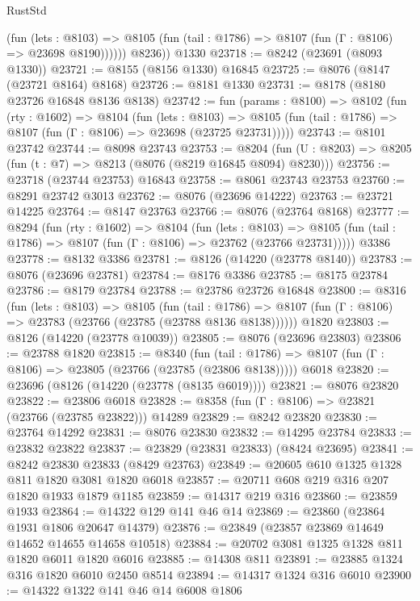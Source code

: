 \begin{lexlean}{RustStd}
\begin{coremodule}
              (fun (lets : @8103) =>
              @8105 (fun (tail : @1786) => @8107 (fun (Γ : @8106) => @23698 @8190))))))
        @8236))
    @1330
@23718 := @8242 (@23691 (@8093 @1330))
@23721 := @8155 (@8156 @1330) @16845
@23725 := @8076 (@8147 (@23721 @8164) @8168)
@23726 := @8181 @1330
@23731 := @8178 (@8180 @23726 @16848 @8136 @8138)
@23742 := fun (params : @8100) =>
  @8102
    (fun (rty : @1602) =>
    @8104
      (fun (lets : @8103) =>
      @8105 (fun (tail : @1786) => @8107 (fun (Γ : @8106) => @23698 (@23725 @23731)))))
@23743 := @8101 @23742
@23744 := @8098 @23743
@23753 := @8204
    (fun (U : @8203) => @8205 (fun (t : @7) => @8213 (@8076 (@8219 @16845 @8094) @8230)))
@23756 := @23718 (@23744 @23753) @16843
@23758 := @8061 @23743 @23753
@23760 := @8291 @23742 @3013
@23762 := @8076 (@23696 @14222)
@23763 := @23721 @14225
@23764 := @8147 @23763
@23766 := @8076 (@23764 @8168)
@23777 := @8294
    (fun (rty : @1602) =>
    @8104
      (fun (lets : @8103) =>
      @8105 (fun (tail : @1786) => @8107 (fun (Γ : @8106) => @23762 (@23766 @23731)))))
    @3386
@23778 := @8132 @3386
@23781 := @8126 (@14220 (@23778 @8140))
@23783 := @8076 (@23696 @23781)
@23784 := @8176 @3386
@23785 := @8175 @23784
@23786 := @8179 @23784
@23788 := @23786 @23726 @16848
@23800 := @8316
    (fun (lets : @8103) =>
    @8105
      (fun (tail : @1786) =>
      @8107 (fun (Γ : @8106) => @23783 (@23766 (@23785 (@23788 @8136 @8138))))))
    @1820
@23803 := @8126 (@14220 (@23778 @10039))
@23805 := @8076 (@23696 @23803)
@23806 := @23788 @1820
@23815 := @8340
    (fun (tail : @1786) => @8107 (fun (Γ : @8106) => @23805 (@23766 (@23785 (@23806 @8138)))))
    @6018
@23820 := @23696 (@8126 (@14220 (@23778 (@8135 @6019))))
@23821 := @8076 @23820
@23822 := @23806 @6018
@23828 := @8358 (fun (Γ : @8106) => @23821 (@23766 (@23785 @23822))) @14289
@23829 := @8242 @23820
@23830 := @23764 @14292
@23831 := @8076 @23830
@23832 := @14295 @23784
@23833 := @23832 @23822
@23837 := @23829 (@23831 @23833) (@8424 @23695)
@23841 := @8242 @23830 @23833 (@8429 @23763)
@23849 := @20605 @610 @1325 @1328 @811 @1820 @3081 @1820 @6018
@23857 := @20711 @608 @219 @316 @207 @1820 @1933 @1879 @1185
@23859 := @14317 @219 @316
@23860 := @23859 @1933
@23864 := @14322 @129 @141 @46 @14
@23869 := @23860 (@23864 @1931 @1806 @20647 @14379)
@23876 := @23849 (@23857 @23869 @14649 @14652 @14655 @14658 @10518)
@23884 := @20702 @3081 @1325 @1328 @811 @1820 @6011 @1820 @6016
@23885 := @14308 @811
@23891 := @23885 @1324 @316 @1820 @6010 @2450 @8514
@23894 := @14317 @1324 @316 @6010
@23900 := @14322 @1322 @141 @46 @14 @6008 @1806

\end{coremodule}
\end{lexlean}
